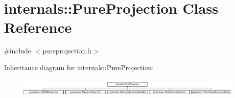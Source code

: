 \hypertarget{classinternals_1_1_pure_projection}{\section{internals\-:\-:\-Pure\-Projection \-Class \-Reference}
\label{classinternals_1_1_pure_projection}
}


{\ttfamily \#include $<$pureprojection.\-h$>$}

\-Inheritance diagram for internals\-:\-:\-Pure\-Projection\-:\begin{figure}[H]
\begin{center}
\leavevmode
\includegraphics[height=0.906883cm]{classinternals_1_1_pure_projection}
\end{center}
\end{figure}
